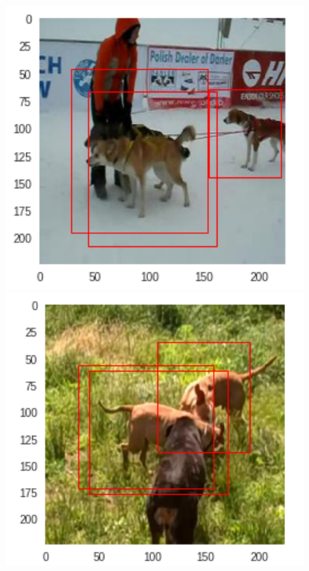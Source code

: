 \documentclass{article}
\begin{document}
\begin{figure}[H]

\begin{minipage}{.4\textwidth}
	\includegraphics[width=\textwidth]{many_detected1.png}
\end{minipage}%
\hfill
\begin{minipage}{.4\textwidth}
	\includegraphics[width=\textwidth]{many_detected2.png}
\end{minipage}%
\hfill

\end{figure}
\end{document}
